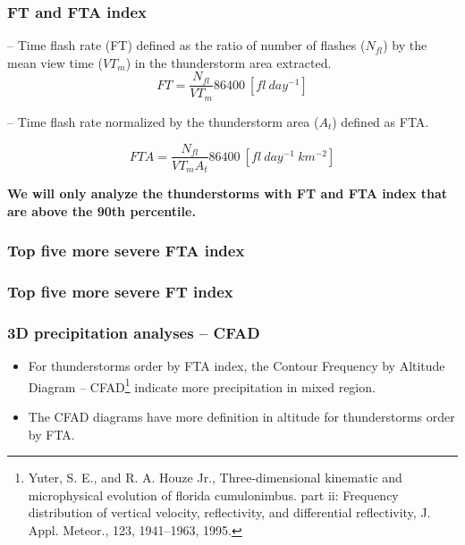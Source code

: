 \documentclass[smaller]{beamer}
\begin{document}
\begin{frame}
\frametitle{}

\end{frame}




\begin{frame}
\frametitle{FT and FTA index}

-- Time flash rate (FT) defined as the ratio of number of flashes ($N_{fl}$) by the mean view time ($VT_m$) in the thunderstorm area extracted.	
\begin{equation}
FT = \frac{N_{fl} }{VT_m} 86400 ~[fl~day^{-1}]    
\end{equation}

-- Time flash rate normalized by the thunderstorm area ($A_t$) defined as FTA. 

\begin{equation}
FTA = \frac{N_{fl} }{VT_m A_t } 86400 ~[fl~day^{-1}~km^{-2}]
\end{equation}

\bigskip
\textbf{We will only analyze the thunderstorms with FT and FTA index that are above the 90th percentile.} 

\end{frame}



\begin{frame}
\frametitle{Top five more severe FTA index}

\end{frame}

\begin{frame}
\frametitle{Top five more severe FT index}

\end{frame}



\begin{frame}
\frametitle{3D precipitation analyses -- CFAD}
\begin{itemize}

\item For thunderstorms order by FTA index, the Contour Frequency by Altitude Diagram -- CFAD\footnote{Yuter, S. E., and R. A. Houze Jr., Three-dimensional kinematic and microphysical evolution of florida cumulonimbus.
part ii: Frequency distribution of vertical velocity, reflectivity, and differential reflectivity, J. Appl. Meteor., 123,
1941–1963, 1995.} indicate more precipitation in mixed region.
\item The CFAD diagrams have more definition in altitude for thunderstorms order by FTA.
\end{itemize}
\end{frame}
  
\end{document}
